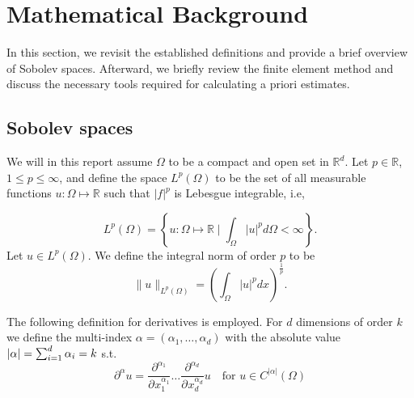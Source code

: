 
\section{Mathematical Background}%
\label{sec:mathematical_background}

In this section, we revisit the established definitions and provide a brief overview of Sobolev spaces. Afterward, we briefly review the finite element method and discuss the necessary tools required for calculating a priori estimates.


\subsection{Sobolev spaces}%
\label{sub:notation}

We will in this report assume $\Omega $ to be a compact and open set in $\mathbb{R} ^{d}$. Let $p \in \mathbb{R} $, $ 1 \le  p \le  \infty$, and  define the space $L^{p}\left( \Omega  \right) $ to be the set of all measurable functions $u: \Omega  \mapsto \mathbb{R} $ such that
$\left\lvert f \right\rvert ^{p}$ is Lebesgue integrable, i.e,

\begin{equation*}
    L^{p}\left( \Omega  \right) = \left\{ u: \Omega \mapsto \mathbb{R}  \mid \int_{\Omega }^{} \left\lvert u \right\rvert ^{p} d \Omega  < \infty  \right\}
.\end{equation*}
Let $u \in L^{p}\left( \Omega  \right) $. We define the integral norm of order $p$ to be \[
\| u \|_{ L^{p}\left( \Omega  \right)  }^{  }  = \left( \int_{\Omega }^{} \left\lvert u \right\rvert ^{p} dx  \right) ^{\frac{1}{p}}.
\]

The following definition for derivatives is employed.
For $d$ dimensions of order $k$ we define the multi-index $\alpha  = ( \alpha _{1}, \ldots, \alpha _{d})  $ with the absolute value $\left\lvert  \alpha   \right\rvert = \sum_{i=1}^{d}  \alpha _{i} = k $ s.t.
\begin{equation}
    \label{eq:der}
\partial ^{\alpha} u = \frac{\partial ^{ \alpha_{1}  }  } {\partial^{} x_{1}^{\alpha _{1}}  } \ldots \frac{\partial ^{ \alpha_{d}  }  } {\partial^{} x_{d}^{\alpha _{d}}  } u \quad  \text{for }u \in C^{\left\lvert \alpha  \right\rvert }( \Omega )
\end{equation}

